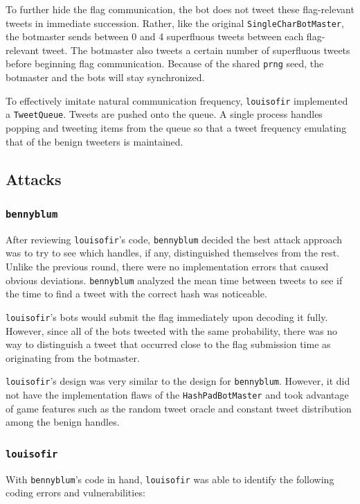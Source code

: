 \documentclass[11pt, oneside]{article} %
\numberwithin{equation}{section} %
\numberwithin{figure}{section} %
\numberwithin{table}{section} %
\renewcommand{\c}[1]{\texttt{#1}}
\newcommand{\teambb}{\c{bennyblum}}
\newcommand{\teamol}{\c{louisofir}}
\begin{document}
			To further hide the flag communication, the bot does not tweet these flag-relevant tweets in immediate succession. Rather, like the original \c{SingleCharBotMaster}, the botmaster sends between 0 and 4 superfluous tweets between each flag-relevant tweet. The botmaster also tweets a certain number of superfluous tweets before beginning flag communication. Because of the shared \c{prng} seed, the botmaster and the bots
			will stay synchronized.

			To effectively imitate natural communication frequency, \teamol{} implemented a \c{TweetQueue}. Tweets are pushed onto the queue. A single process handles popping and tweeting items from the queue so that a tweet frequency emulating that of the benign tweeters is maintained.
	
    \subsection{Attacks}

		\subsubsection{\teambb{}}

		After reviewing \teamol{}'s code, \teambb{} decided the best attack approach was to try to see which handles, if any, distinguished themselves from the rest. Unlike the previous round, there were no implementation errors that caused obvious deviations. \teambb{} analyzed the mean time between tweets to see if the time to find a tweet with the correct hash was noticeable. 

		\teamol{}'s bots would submit the flag immediately upon decoding it fully. However, since all of the bots tweeted with the same probability, there was no way to distinguish a tweet that occurred close to the flag submission time as originating from the botmaster. 

		\teamol{}'s design was very similar to the design for \teambb{}. However, it did not have the implementation flaws of the \c{HashPadBotMaster} and took advantage of game features such as the random tweet oracle and constant tweet distribution among the benign handles.

		\subsubsection{\teamol{}}
			With \teambb{}'s code in hand, \teamol{} was able to identify the following coding errors and vulnerabilities:  
			
\end{document}
